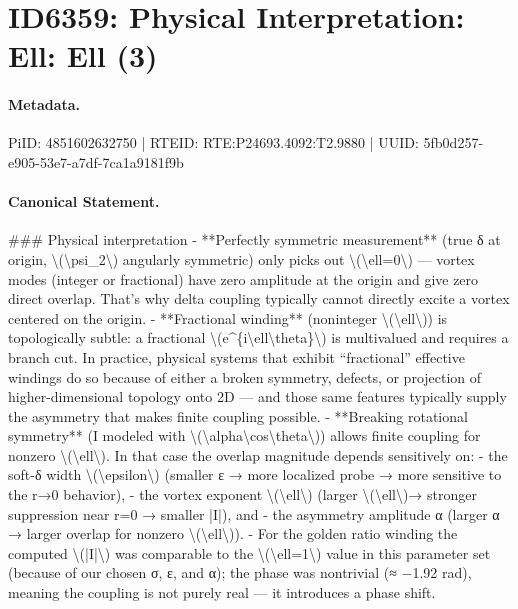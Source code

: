 \section*{ID6359: Physical Interpretation: Ell: Ell (3)}
\paragraph{Metadata.}
PiID: 4851602632750 | RTEID: RTE:P24693.4092:T2.9880 | UUID: 5fb0d257-e905-53e7-a7df-7ca1a9181f9b

\paragraph{Canonical Statement.}
\#\#\# Physical interpretation - **Perfectly symmetric measurement** (true δ at origin, \textbackslash{}(\textbackslash{}psi\_2\textbackslash{}) angularly symmetric) only picks out \textbackslash{}(\textbackslash{}ell=0\textbackslash{}) — vortex modes (integer or fractional) have zero amplitude at the origin and give zero direct overlap. That’s why delta coupling typically cannot directly excite a vortex centered on the origin. - **Fractional winding** (noninteger \textbackslash{}(\textbackslash{}ell\textbackslash{})) is topologically subtle: a fractional \textbackslash{}(e\textasciicircum{}\{i\textbackslash{}ell\textbackslash{}theta\}\textbackslash{}) is multivalued and requires a branch cut. In practice, physical systems that exhibit “fractional” effective windings do so because of either a broken symmetry, defects, or projection of higher-dimensional topology onto 2D — and those same features typically supply the asymmetry that makes finite coupling possible. - **Breaking rotational symmetry** (I modeled with \textbackslash{}(\textbackslash{}alpha\textbackslash{}cos\textbackslash{}theta\textbackslash{})) allows finite coupling for nonzero \textbackslash{}(\textbackslash{}ell\textbackslash{}). In that case the overlap magnitude depends sensitively on: - the soft-δ width \textbackslash{}(\textbackslash{}epsilon\textbackslash{}) (smaller ε → more localized probe → more sensitive to the r→0 behavior), - the vortex exponent \textbackslash{}(\textbackslash{}ell\textbackslash{}) (larger \textbackslash{}(\textbackslash{}ell\textbackslash{})→ stronger suppression near r=0 → smaller |I|), and - the asymmetry amplitude α (larger α → larger overlap for nonzero \textbackslash{}(\textbackslash{}ell\textbackslash{})). - For the golden ratio winding the computed \textbackslash{}(|I|\textbackslash{}) was comparable to the \textbackslash{}(\textbackslash{}ell=1\textbackslash{}) value in this parameter set (because of our chosen σ, ε, and α); the phase was nontrivial (≈ −1.92 rad), meaning the coupling is not purely real — it introduces a phase shift.

